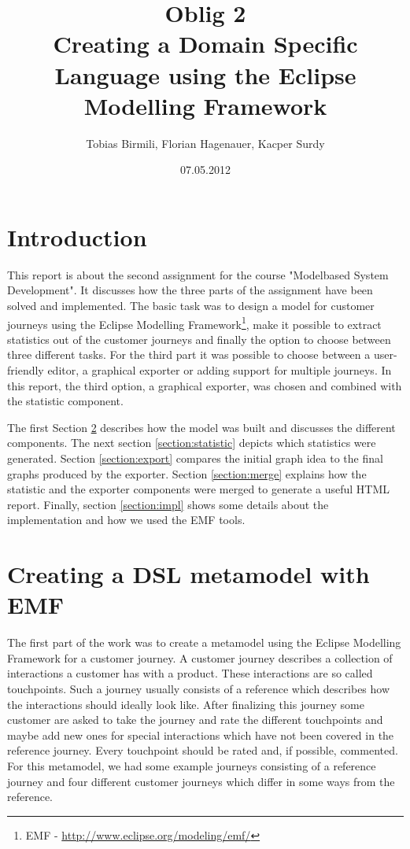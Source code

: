 \documentclass[12pt]{scrartcl}
\title{Oblig 2 \\ Creating a Domain Specific Language using the Eclipse Modelling Framework}
\author{Tobias Birmili, Florian Hagenauer, Kacper Surdy}
\date{07.05.2012}
\begin{document}
\maketitle

\tableofcontents

\section{Introduction}

This report is about the second assignment for the course "Modelbased System Development". It discusses how the three
parts of the assignment have been solved and implemented. The basic task was to design a model for customer journeys using
the Eclipse Modelling Framework\footnote{EMF - \url{http://www.eclipse.org/modeling/emf/}}, make it possible to extract 
statistics out of the customer journeys and finally the option to choose between three different tasks. For the third part 
it was possible to choose between a user-friendly editor, a graphical exporter or adding support for multiple journeys. In
this report, the third option, a graphical exporter, was chosen and combined with the statistic component.

The first Section \ref{section:model} describes how the model was built and discusses the different components. The next
section \ref{section:statistic} depicts which statistics were generated. Section \ref{section:export}
compares the initial graph idea to the final graphs produced by the exporter. Section \ref{section:merge} explains how
the statistic and the exporter components were merged to generate a useful HTML report. Finally, section \ref{section:impl} shows
some details about the implementation and how we used the EMF tools.

\section{Creating a DSL metamodel with EMF} 
\label{section:model}

The first part of the work was to create a metamodel using the Eclipse Modelling Framework for a customer
journey. A customer journey describes a collection of interactions a customer has with a product. These interactions are
so called touchpoints. Such a journey usually consists of a reference which describes how the interactions should ideally
look like. After finalizing this journey some customer are asked to take the journey and rate the different touchpoints and 
maybe add new ones for special interactions which have not been covered in the reference journey. Every touchpoint should 
be rated and, if possible, commented. For this metamodel, we had some example journeys consisting of a reference journey 
and four different customer journeys which differ in some ways from the reference. 
\end{document}

